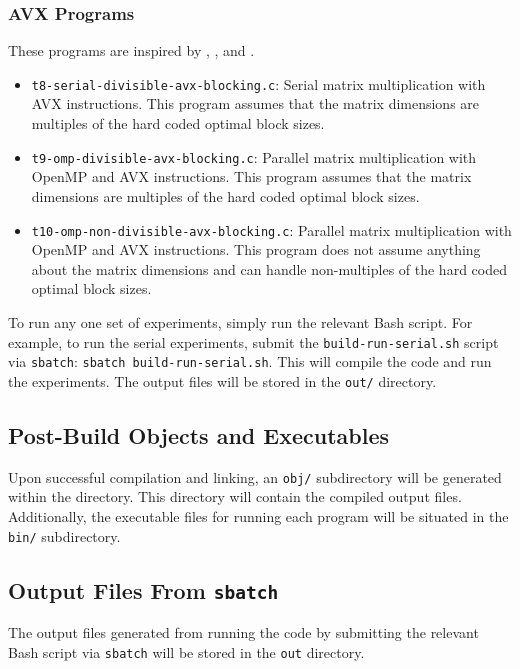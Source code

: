 \documentclass{article}
\begin{document}
\subsubsection*{AVX Programs}
These programs are inspired by \cite{6877334}, \cite{ANATOMY}, and \cite{BLAS-P}.
\begin{itemize}
    \item \texttt{t8-serial-divisible-avx-blocking.c}: Serial matrix multiplication with AVX instructions. This program assumes
    that the matrix dimensions are multiples of the hard coded optimal block sizes.
    \item \texttt{t9-omp-divisible-avx-blocking.c}: Parallel matrix multiplication with OpenMP and AVX instructions. This program assumes
    that the matrix dimensions are multiples of the hard coded optimal block sizes.
    \item \texttt{t10-omp-non-divisible-avx-blocking.c}: Parallel matrix multiplication with OpenMP and AVX instructions. This program does not assume
    anything about the matrix dimensions and can handle non-multiples of the hard coded optimal block sizes.
\end{itemize}

\noindent To run any one set of experiments, simply run the relevant Bash script. For example, to run the serial experiments, submit the \texttt{build-run-serial.sh}
script via \texttt{sbatch}: \texttt{sbatch build-run-serial.sh}. This will compile the code and run the experiments. The output files will be stored in the \texttt{out/} directory.

\subsection{Post-Build Objects and Executables}
Upon successful compilation and linking, an \texttt{obj/} subdirectory will be generated within the directory. 
This directory will contain the compiled output files. Additionally, the executable files for running each program will be 
situated in the \texttt{bin/} subdirectory.

\subsection{Output Files From \texttt{sbatch}}
The output files generated from running the code by submitting the relevant Bash script via \texttt{sbatch} will be 
stored in the \texttt{out} directory. 
\newpage
\end{document}
